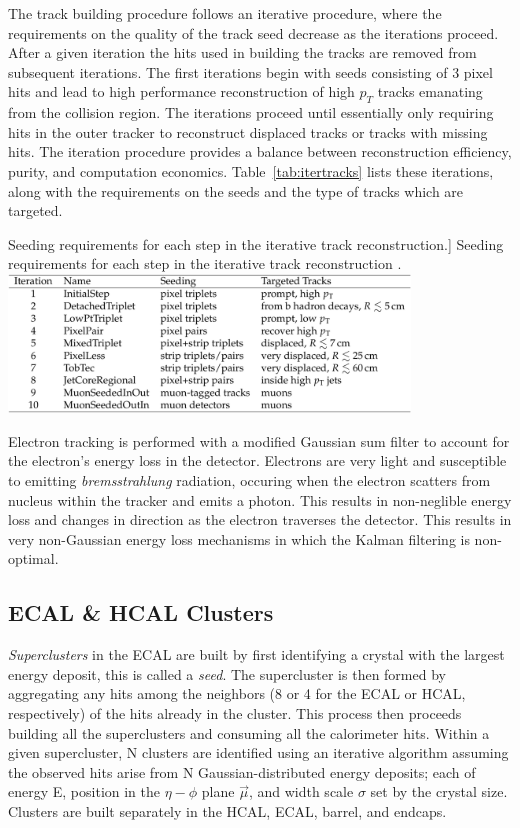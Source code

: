 The track building procedure follows an iterative procedure, where the requirements on the quality of the track seed decrease as the iterations proceed. After a given iteration the hits used in building the tracks are removed from subsequent iterations. The first iterations begin with seeds consisting of 3 pixel hits and lead to high performance reconstruction of high $p_{T}$ tracks emanating from the collision region. The iterations proceed until essentially only requiring hits in the outer tracker to reconstruct displaced tracks or tracks with missing hits. The iteration procedure provides a balance between reconstruction efficiency, purity, and computation economics. Table~\ref{tab:itertracks} lists these iterations, along with the requirements on the seeds and the type of tracks which are targeted.

\begin{table}[hbp!]
\caption
[Seeding requirements for each step in the iterative track reconstruction.]
{Seeding requirements for each step in the iterative track reconstruction \cite{CMS-PRF-14-001}.}
\centering
\includegraphics[width=0.8\textwidth]{figs/itertracks.png}
\label{tab:itertracks}
\end{table}

Electron tracking is performed with a modified Gaussian sum filter to account for the electron's energy loss in the detector. Electrons are very light and susceptible to emitting \textit{bremsstrahlung} radiation, occuring when the electron scatters from nucleus within the tracker and emits a photon. This results in non-neglible energy loss and changes in direction as the electron traverses the detector. This results in very non-Gaussian energy loss mechanisms in which the Kalman filtering is non-optimal.

\subsection{ECAL \& HCAL Clusters}

\textit{Superclusters} in the ECAL are built by first identifying a crystal with the largest energy deposit, this is called a \textit{seed}. The supercluster is then formed by aggregating any hits among the neighbors (8 or 4 for the ECAL or HCAL, respectively) of the hits already in the cluster. This process then proceeds building all the superclusters and consuming all the calorimeter hits. Within a given supercluster, N clusters are identified using an iterative algorithm assuming the observed hits arise from N Gaussian-distributed energy deposits; each of energy E, position in the $\eta-\phi$ plane $\vec{\mu}$, and width scale $\sigma$ set by the crystal size. Clusters are built separately in the HCAL, ECAL, barrel, and endcaps.

